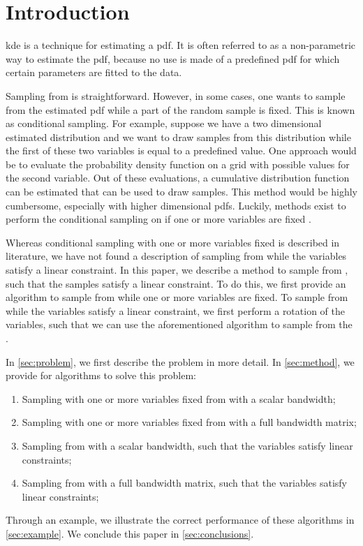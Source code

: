 \section{Introduction}
\label{sec:introduction}

\ac{kde} \autocite{parzen1962estimation, rosenblatt1956remarks} is a technique for estimating a \ac{pdf}. 
It is often referred to as a non-parametric way to estimate the \ac{pdf}, because no use is made of a predefined \ac{pdf} for which certain parameters are fitted to the data. 

Sampling from  is straightforward. 
However, in some cases, one wants to sample from the estimated \ac{pdf} while a part of the random sample is fixed.
This is known as conditional sampling. 
For example, suppose we have a two dimensional estimated distribution and we want to draw samples from this distribution while the first of these two variables is equal to a predefined value. 
One approach would be to evaluate the probability density function on a grid with possible values for the second variable. 
Out of these evaluations, a cumulative distribution function can be estimated that can be used to draw samples. 
This method would be highly cumbersome, especially with higher dimensional \acp{pdf}. 
Luckily, methods exist to perform the conditional sampling on  if one or more variables are fixed \autocite{hyndman1996estimating, holmes2007fast}.

Whereas conditional sampling with one or more variables fixed is described in literature, we have not found a description of sampling from  while the variables satisfy a linear constraint. 
In this paper, we describe a method to sample from , such that the samples satisfy a linear constraint. 
To do this, we first provide an algorithm to sample from  while one or more variables are fixed. 
To sample from  while the variables satisfy a linear constraint, we first perform a rotation of the variables, such that we can use the aforementioned algorithm to sample from the . 

In \cref{sec:problem}, we first describe the problem in more detail.
In \cref{sec:method}, we provide for algorithms to solve this problem:
\begin{enumerate}
	\item Sampling with one or more variables fixed from  with a scalar bandwidth;
	\item Sampling with one or more variables fixed from  with a full bandwidth matrix;
	\item Sampling from  with a scalar bandwidth, such that the variables satisfy linear constraints;
	\item Sampling from  with a full bandwidth matrix, such that the variables satisfy linear constraints;
\end{enumerate}
Through an example, we illustrate the correct performance of these algorithms in \cref{sec:example}.
We conclude this paper in \cref{sec:conclusions}.
